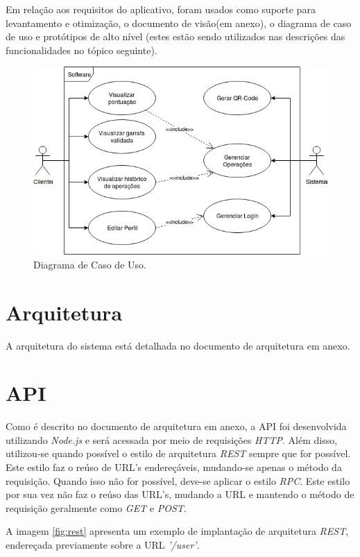 Em relação aos requisitos do aplicativo, foram usados como suporte para levantamento e otimização, o documento de visão(em anexo), o diagrama de caso de uso e protótipos de alto nível (estes estão sendo utilizados nas descrições das funcionalidades no tópico seguinte).

\begin{figure}[!ht]
	\centering
		\includegraphics[scale=0.4]{figuras/software/2-Diagrama-de-Caso-de-Uso.png}
	\caption{Diagrama de Caso de Uso.}
\end{figure}

\section{Arquitetura}

A arquitetura do sistema está detalhada no documento de arquitetura em anexo.

\section{API}

Como é descrito no documento de arquitetura em anexo, a API foi desenvolvida utilizando \textit{Node.js} e será acessada por meio de requisições \textit{HTTP}. Além disso, utilizou-se quando possível o estilo de arquitetura \textit{REST} sempre que for possível. Este estilo faz o reúso de URL's endereçáveis, mudando-se apenas o método da requisição. Quando isso não for possível, deve-se aplicar o estilo \textit{RPC}. Este estilo por sua vez não faz o reúso das URL's, mudando a URL e mantendo o método de requisição geralmente como \textit{GET} e \textit{POST}.

A imagem \ref{fig:rest} apresenta um exemplo de implantação de arquitetura \textit{REST}, endereçada previamente sobre a URL \textit{'/user'}.

